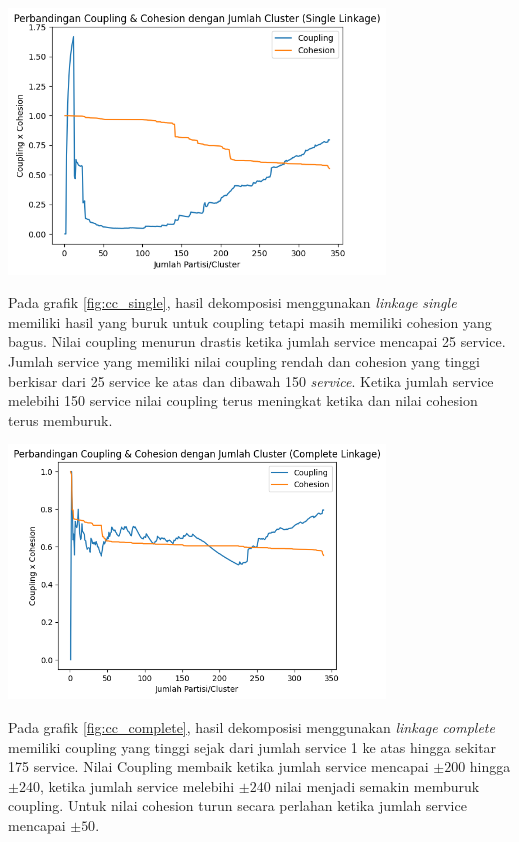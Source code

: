 \begin{center}
	\includegraphics[width=10cm]{img/bab_4/cc_single.png}
	\label{fig:cc_single}
\end{center}

 Pada grafik \ref{fig:cc_single}, hasil dekomposisi menggunakan \textit{linkage} \textit{single} memiliki hasil yang buruk untuk coupling tetapi masih memiliki cohesion yang bagus. Nilai coupling menurun drastis ketika jumlah service mencapai 25 service. Jumlah service yang memiliki nilai coupling rendah dan cohesion yang tinggi berkisar dari 25 service ke atas dan dibawah 150 \textit{service}. Ketika jumlah service melebihi 150 service nilai coupling terus meningkat ketika dan nilai cohesion terus memburuk.
 
\begin{center}
	\includegraphics[width=10cm]{img/bab_4/cc_comp.png}
	\label{fig:cc_complete}
\end{center}

Pada grafik \ref{fig:cc_complete}, hasil dekomposisi menggunakan \textit{linkage} \textit{complete} memiliki coupling yang tinggi sejak dari jumlah service 1 ke atas hingga sekitar 175 service. Nilai Coupling membaik ketika jumlah service mencapai   $\pm 200$  hingga  $\pm 240$, ketika jumlah service melebihi  $\pm 240$ nilai menjadi semakin memburuk coupling. Untuk nilai cohesion turun secara perlahan ketika jumlah service mencapai  $\pm 50$.

